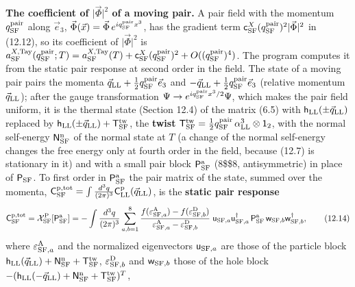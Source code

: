 \documentclass[
  10pt,
]{article}
\begin{document}
\textbf{The coefficient of \(\lvert\vec\Phi\rvert^2\) of a moving pair.}
A pair field with the momentum \(q^{\rm pair}_{\rm SF}\) along
\(\vec e_3\),
\(\vec\Phi(\vec x)=\vec\Phi\,e^{iq^{\rm pair}_{\rm SF}x^3}\), has the
gradient term
\(\mathsf c^X_{\rm SF}(q^{\rm pair}_{\rm SF})^2\lvert\vec\Phi\rvert^2\)
in (12.12), so its coefficient of \(\lvert\vec\Phi\rvert^2\) is
\(a^{X,{\rm Tay}}_{\rm SF}(q^{\rm pair}_{\rm SF};T)=a^{X,{\rm Tay}}_{\rm SF}(T)+\mathsf c^X_{\rm SF}(q^{\rm pair}_{\rm SF})^2+O((q^{\rm pair}_{\rm SF})^4)\).
The program computes it from the static pair response at second order in
the field. The state of a moving pair pairs the momenta
\(\vec q_{\rm LL}+\tfrac12q^{\rm pair}_{\rm SF}\vec e_3\) and
\(-\vec q_{\rm LL}+\tfrac12q^{\rm pair}_{\rm SF}\vec e_3\) (relative
momentum \(\vec q_{\rm LL}\)); after the gauge transformation
\(\Psi\to e^{iq^{\rm pair}_{\rm SF}x^3/2}\Psi\), which makes the pair
field uniform, it is the thermal state (Section 12.4) of the matrix
(6.5) with \(\mathsf h_{\rm LL}(\pm\vec q_{\rm LL})\) replaced by
\(\mathsf h_{\rm LL}(\pm\vec q_{\rm LL})+\mathsf T^{\rm tw}_{\rm SF}\),
the \textbf{twist}
\(\mathsf T^{\rm tw}_{\rm SF}=\tfrac12q^{\rm pair}_{\rm SF}\,\alpha^3_{\rm LL}\otimes\mathsf 1_2\),
with the normal self-energy \(\mathsf N^{\rm n}_{\rm SF}\) of the normal
state at \(T\) (a change of the normal self-energy changes the free
energy only at fourth order in the field, because (12.7) is stationary
in it) and with a small pair block \(\mathsf P^{\rm a}_{\rm SF}\)
(8\$\times\$8, antisymmetric) in place of \(\mathsf P_{\rm SF}\). To
first order in \(\mathsf P^{\rm a}_{\rm SF}\) the pair matrix of the
state, summed over the momenta,
\(\mathsf C^{\rm p,tot}_{\rm SF}=\int\frac{d^3q}{(2\pi)^3}\mathsf C^{\rm p}_{\rm LL}(\vec q_{\rm LL})\),
is the \textbf{static pair response}
\[\mathsf C^{\rm p,tot}_{\rm SF}=\mathcal X^{\rm P}_{\rm SF}[\mathsf P^{\rm a}_{\rm SF}]=-\int\frac{d^3q}{(2\pi)^3}\sum_{a,b=1}^8\frac{f(\varepsilon^{\rm A}_{{\rm SF},a})-f(\varepsilon^{\rm D}_{{\rm SF},b})}{\varepsilon^{\rm A}_{{\rm SF},a}-\varepsilon^{\rm D}_{{\rm SF},b}}\;\mathsf u_{{\rm SF},a}\mathsf u_{{\rm SF},a}^\dagger\,\mathsf P^{\rm a}_{\rm SF}\,\mathsf w_{{\rm SF},b}\mathsf w_{{\rm SF},b}^\dagger,\tag{12.14}\]
where \(\varepsilon^{\rm A}_{{\rm SF},a}\) and the normalized
eigenvectors \(\mathsf u_{{\rm SF},a}\) are those of the particle block
\(\mathsf h_{\rm LL}(\vec q_{\rm LL})+\mathsf N^{\rm n}_{\rm SF}+\mathsf T^{\rm tw}_{\rm SF}\),
\(\varepsilon^{\rm D}_{{\rm SF},b}\) and \(\mathsf w_{{\rm SF},b}\)
those of the hole block
\(-(\mathsf h_{\rm LL}(-\vec q_{\rm LL})+\mathsf N^{\rm n}_{\rm SF}+\mathsf T^{\rm tw}_{\rm SF})^T\),
\end{document}
